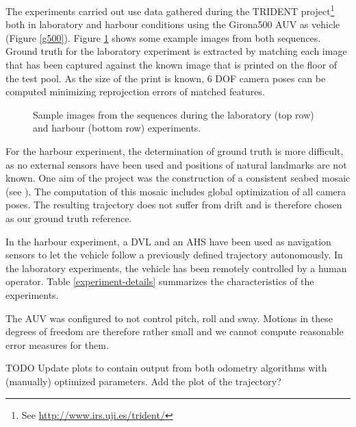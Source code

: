 \documentclass[conference]{IEEEtran}
\begin{document}
The experiments carried out use data gathered during the TRIDENT project\footnote{See \url{http://www.irs.uji.es/trident/}} both in laboratory and harbour conditions using the Girona500 AUV \cite{Ribas2012} as vehicle (Figure \ref{g500}). Figure \ref{sample-images} shows some example images from both sequences. Ground truth for the laboratory experiment is extracted by matching each image that has been captured against the known image that is printed on the floor of the test pool. As the size of the print is known, 6 DOF camera poses can be computed minimizing reprojection errors of matched features.
\begin{figure}
  \noindent{}
  \caption{Sample images from the sequences during the laboratory (top row) and harbour (bottom row) experiments.}
  \label{sample-images}
\end{figure}

For the harbour experiment, the determination of ground truth is more difficult, as no external sensors have been used and positions of natural landmarks are not known. One aim of the project was the construction of a consistent seabed mosaic (see \cite{Ferrer2007}). The computation of this mosaic includes global optimization of all camera poses. The resulting trajectory does not suffer from drift and is therefore chosen as our ground truth reference.

In the harbour experiment, a DVL and an AHS have been used as navigation sensors to let the vehicle follow a previously defined trajectory autonomously. In the laboratory experiments, the vehicle has been remotely controlled by a human operator. Table \ref{experiment-details} summarizes the characteristics of the experiments.

The AUV was configured to not control pitch, roll and sway. Motions in these degrees of freedom are therefore rather small and we cannot compute reasonable error measures for them.

TODO Update plots to contain output from both odometry algorithms with (manually) optimized parameters. Add the plot of the trajectory?
\end{document}
